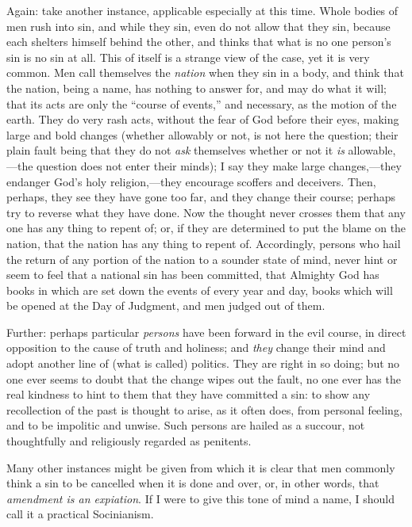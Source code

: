 Again: take another instance, applicable especially at this time.
Whole bodies of men rush into sin, and while they sin, even do not
allow that they sin, because each shelters himself behind the other,
and thinks that what is no one person's sin is no sin at all. This of
itself is a strange view of the case, yet it is very common. Men call
themselves the \emph{nation} when they sin in a body, and think that
the nation, being a name, has nothing to answer for, and may do what
it will; that its acts are only the ``course of events,'' and
necessary, as the motion of the earth. They do very rash acts, without
the fear of God before their eyes, making large and bold changes
(whether allowably or not, is not here the question; their plain fault
being that they do not \emph{ask} themselves whether or not it \emph{is}
allowable,—the question does not enter their minds); I say they make
large changes,—they endanger God's holy religion,—they encourage
scoffers and deceivers. Then, perhaps, they see they have gone too
far, and they change their course; perhaps try to reverse what they
have done. Now the thought never crosses them that any one has any
thing to repent of; or, if they are determined to put the blame on the
nation, that the nation has any thing to repent of. Accordingly,
persons who hail the return of any portion of the nation to a sounder
state of mind, never hint or seem to feel that a national sin has been
committed, that Almighty God has books in which are set down the
events of every year and day, books which will be opened at the Day of
Judgment, and men judged out of them.

Further: perhaps particular \emph{persons} have been forward in the
evil course, in direct opposition to the cause of truth and holiness;
and \emph{they} change their mind and adopt another line of (what is
called) politics. They are right in so doing; but no one ever seems to
doubt that the change wipes out the fault, no one ever has the real
kindness to hint to them that they have committed a sin: to show any
recollection of the past is thought to arise, as it often does, from
personal feeling, and to be impolitic and unwise. Such persons are
hailed as a succour, not thoughtfully and religiously regarded as
penitents.

Many other instances might be given from which it is clear that men
commonly think a sin to be cancelled when it is done and over, or, in
other words, that \emph{amendment is an expiation}. If I were to give
this tone of mind a name, I should call it a practical Socinianism.

